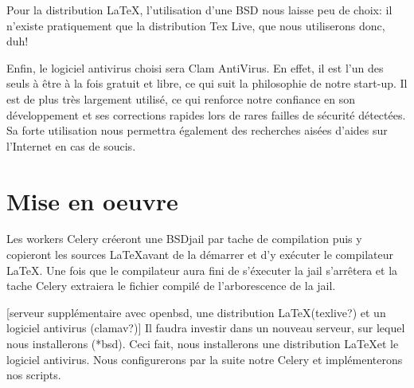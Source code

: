 \documentclass[10pt,a4paper]{article}
\begin{document}
Pour la distribution \LaTeX, l'utilisation d'une BSD nous laisse peu de choix: il n'existe pratiquement que la distribution Tex Live, que nous utiliserons donc, duh! %

Enfin, le logiciel antivirus choisi sera Clam AntiVirus.
En effet, il est l'un des seuls à être à la fois gratuit et libre, ce qui suit la philosophie de notre start-up.
Il est de plus très largement utilisé, ce qui renforce notre confiance en son développement et ses corrections rapides lors de rares failles de sécurité détectées.
Sa forte utilisation nous permettra également des recherches aisées d'aides sur l'Internet en cas de soucis.

\section{Mise en oeuvre}

Les workers Celery créeront une BSDjail par tache de compilation puis y copieront les sources \LaTeX avant de la démarrer et d'y exécuter le compilateur \LaTeX.
Une fois que le compilateur aura fini de s'éxecuter la jail s'arrêtera et la tache Celery extraiera le fichier compilé de l'arborescence de la jail.

[serveur supplémentaire avec openbsd, une distribution \LaTeX (texlive?) et un logiciel antivirus (clamav?)]
Il faudra investir dans un nouveau serveur, sur lequel nous installerons (*bsd).
Ceci fait, nous installerons une distribution \LaTeX et le logiciel antivirus.
Nous configurerons par la suite notre Celery et implémenterons nos scripts.
\end{document}
